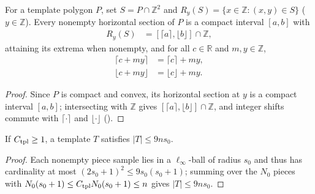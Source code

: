 \begin{lemma}
    \label{thm:area_law_sample_rows}
    \leanok
    For a template polygon $P$, set $S=P\cap\mathbb Z^2$ and $R_y(S)=\{x\in\mathbb Z:(x,y)\in S\}$ ($y\in\mathbb Z$). Every nonempty horizontal section of $P$ is a compact interval $[a,b]$ with
    \begin{align}
        R_y(S) & =[\lceil a\rceil,\lfloor b\rfloor]\cap\mathbb Z,
    \end{align}
    attaining its extrema when nonempty, and for all $c\in\mathbb R$ and $m,y\in\mathbb Z$,
    \begin{align}
        \lceil c+my\rceil   & =\lceil c\rceil+my,   \\
        \lfloor c+my\rfloor & =\lfloor c\rfloor+my.
    \end{align}
\end{lemma}
\begin{proof}
    \leanok
    Since $P$ is compact and convex, its horizontal section at $y$ is a compact interval $[a,b]$; intersecting with $\mathbb Z$ gives $[\lceil a\rceil,\lfloor b\rfloor]\cap\mathbb Z$, and integer shifts commute with $\lceil\cdot\rceil$ and $\lfloor\cdot\rfloor$ (\cite[Lemma~9.4]{OpenAI2026AreaLaw}).
\end{proof}

\begin{lemma}
    \label{thm:area_law_template_area}
    \leanok
    If $C_{\rm tpl}\ge1$, a template $T$ satisfies $|T|\le9ns_0$.
\end{lemma}
\begin{proof}
    \leanok
    Each nonempty piece sample lies in a $\ell_\infty$-ball of radius $s_0$ and thus has cardinality at most $(2s_0+1)^2\le9s_0(s_0+1)$; summing over the $N_0$ pieces with $N_0(s_0+1)\le C_{\rm tpl}N_0(s_0+1)\le n$ gives $|T|\le9ns_0$.
\end{proof}

